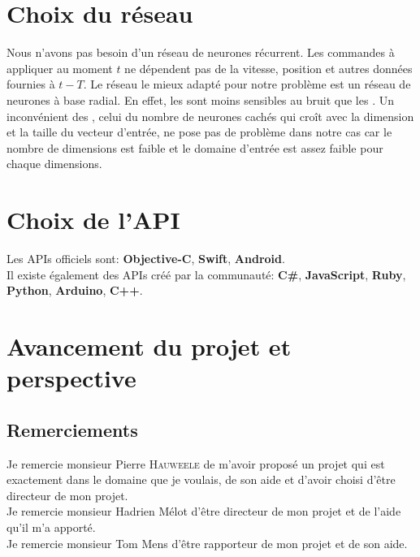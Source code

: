 \documentclass[12pt,a4paper,oneside, titlepage]{article}
\begin{document}
\section{Choix du réseau}
Nous n'avons pas besoin d'un réseau de neurones récurrent. Les commandes à appliquer au moment $t$ ne dépendent pas de la vitesse, position et autres données fournies à $t-T$.
Le réseau le mieux adapté pour notre problème est un réseau de neurones à base radial.
En effet, les \rbf sont moins sensibles au bruit que les \mlp \cite{adversarial,Gauthier}.%
Un inconvénient des \rbf, celui du nombre de neurones cachés qui croît avec la dimension et la taille du vecteur d'entrée, ne pose pas de problème dans notre cas
car le nombre de dimensions est faible
et le domaine d'entrée est assez faible pour chaque dimensions.
\section{Choix de l'API}
Les APIs officiels sont:\cite{SDKofficiels} \textbf{Objective-C}, \textbf{Swift}, \textbf{Android}.\\
Il existe également des APIs créé par la communauté:\cite{gosphero} \textbf{C\#}, \textbf{JavaScript}, \textbf{Ruby}, \textbf{Python}\cite{pythonAPI}, \textbf{Arduino}, \textbf{C++}\cite{cppAPI}.\\
\section{Avancement du projet et perspective}
\subsection*{Remerciements}
\noindent Je remercie monsieur Pierre \textsc{Hauweele} de m'avoir proposé un projet qui est exactement dans le domaine que je voulais, de son aide et d'avoir choisi d'être directeur de mon projet.\\

\noindent Je remercie monsieur Hadrien Mélot d'être directeur de mon projet et de l'aide qu'il m'a apporté.\\

\noindent Je remercie monsieur Tom Mens d'être rapporteur de mon projet et de son aide.\\



\end{document}
